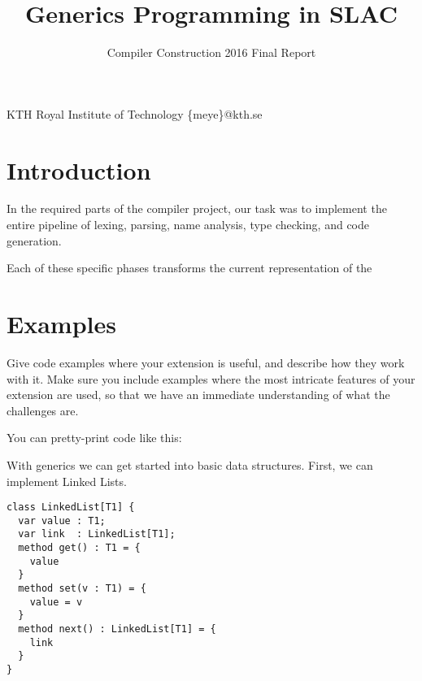 \documentclass[nocopyrightspace,11pt,authoryear,preprint]{sigplanconf}
\begin{document}


\title{Generics Programming in SLAC}
\subtitle{Compiler Construction 2016 Final Report}

           {KTH Royal Institute of Technology}
           {\{meye\}@kth.se}

\maketitle

\section{Introduction}



In the required parts of the compiler project, our task was to implement the 
entire pipeline of lexing, parsing, name analysis, type checking, and code generation.

Each of these specific phases transforms the current representation of the 


\section{Examples}

Give code examples where your extension is useful, and describe how
they work with it. Make sure you include examples where the most
intricate features of your extension are used, so that we have an
immediate understanding of what the challenges are.

You can pretty-print code like this:

With generics we can get started into basic data structures.
First, we can implement Linked Lists.

\begin{lstlisting}
class LinkedList[T1] {
  var value : T1;
  var link  : LinkedList[T1];
  method get() : T1 = {
    value
  }
  method set(v : T1) = {
    value = v
  }
  method next() : LinkedList[T1] = {
    link
  }
}
\end{lstlisting}
\end{document}
